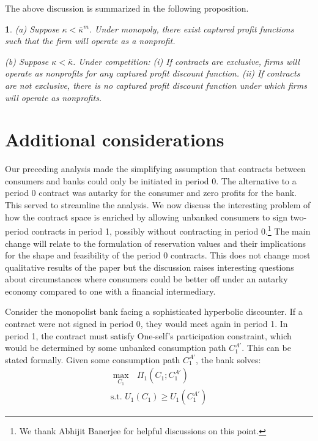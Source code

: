 \documentclass[11pt,english]{article}
\theoremstyle{plain}
\newtheorem{prop}{\protect\propositionname}
\theoremstyle{definition}
\providecommand{\propositionname}{Proposition}
\begin{document}
The above discussion is summarized in the following proposition.
\begin{prop}
(a) Suppose $\kappa<\bar{\kappa}^{m}$. Under monopoly, there exist
captured profit functions such that the firm will operate as a nonprofit.

(b) Suppose $\kappa<\bar{\kappa}$. Under competition: (i) If contracts
are exclusive, firms will operate as nonprofits for any captured profit
discount function. (ii) If contracts are not exclusive, there is no
captured profit discount function under which firms will operate as
nonprofits.
\end{prop}

\section{Additional considerations}\label{considerations}

Our preceding analysis made the simplifying assumption that contracts
between consumers and banks could only be initiated in period 0. The
alternative to a period 0 contract was autarky for the consumer and
zero profits for the bank. This served to streamline the analysis.
We now discuss the interesting problem of how the contract space is
enriched by allowing unbanked consumers to sign two-period contracts
in period 1, possibly without contracting in period 0.\footnote{We thank Abhijit Banerjee for helpful discussions on this point.}
The main change will relate to the formulation of reservation values
and their implications for the shape and feasibility of the period
0 contracts. This does not change most qualitative results of the
paper but the discussion raises interesting questions about circumstances
where consumers could be better off under an autarky economy compared
to one with a financial intermediary.

Consider the monopolist bank facing a sophisticated hyperbolic discounter.
If a contract were not signed in period 0, they would meet again in
period 1. In period 1, the contract must satisfy One-self's participation
constraint, which would be determined by some unbanked consumption
path $C_{1}^{A'}$. This can be stated formally. Given some consumption
path $C_{1}^{A'}$, the bank solves: 
\begin{align*}
\underset{C_{1}}{\max}\text{ }{\Pi_{1}\left(C_{1};C_{1}^{A'}\right)}\\
\text{s.t. }U_{1}\left(C_{1}\right)\geq U_{1}\left(C_{1}^{A'}\right)
\end{align*}
\end{document}
